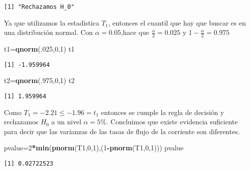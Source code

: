 \documentclass[
  a4paper,
  oneside,
  openany]{book}
\newenvironment{Shaded}{\begin{snugshade}}{\end{snugshade}}
\newcommand{\DecValTok}[1]{\textcolor[rgb]{0.00,0.00,0.81}{#1}}
\newcommand{\KeywordTok}[1]{\textcolor[rgb]{0.13,0.29,0.53}{\textbf{#1}}}
\newcommand{\NormalTok}[1]{#1}
\newcommand{\OperatorTok}[1]{\textcolor[rgb]{0.81,0.36,0.00}{\textbf{#1}}}
\begin{document}
\begin{verbatim}
[1] "Rechazamos H_0"
\end{verbatim}

Ya que utilizamos la estadística \(T_1\), entonces el cuantil que hay que buscar es en una distribución normal. Con \(\alpha=0.05\),hace que \(\frac{\alpha}{2}=0.025\) y \(1-\frac{\alpha}{2}=0.975\)

\begin{Shaded}
\begin{Highlighting}[]
\NormalTok{t1=}\KeywordTok{qnorm}\NormalTok{(.}\DecValTok{025}\NormalTok{,}\DecValTok{0}\NormalTok{,}\DecValTok{1}\NormalTok{)}
\NormalTok{t1}
\end{Highlighting}
\end{Shaded}

\begin{verbatim}
[1] -1.959964
\end{verbatim}

\begin{Shaded}
\begin{Highlighting}[]
\NormalTok{t2=}\KeywordTok{qnorm}\NormalTok{(.}\DecValTok{975}\NormalTok{,}\DecValTok{0}\NormalTok{,}\DecValTok{1}\NormalTok{)}
\NormalTok{t2}
\end{Highlighting}
\end{Shaded}

\begin{verbatim}
[1] 1.959964
\end{verbatim}

Como \(T_1=-2.21\leq -1.96 =t_1\) entonces se cumple la regla de decisión y rechazamos \(H_0\) a un nivel \(\alpha=5\%\). Concluimos que existe evidencia suficiente para decir que las varianzas de las tasas de flujo de la corriente son diferentes.

\begin{Shaded}
\begin{Highlighting}[]
\NormalTok{pvalue=}\DecValTok{2}\OperatorTok{*}\KeywordTok{min}\NormalTok{(}\KeywordTok{pnorm}\NormalTok{(T1,}\DecValTok{0}\NormalTok{,}\DecValTok{1}\NormalTok{),(}\DecValTok{1}\OperatorTok{{-}}\KeywordTok{pnorm}\NormalTok{(T1,}\DecValTok{0}\NormalTok{,}\DecValTok{1}\NormalTok{)))}
\NormalTok{pvalue}
\end{Highlighting}
\end{Shaded}

\begin{verbatim}
[1] 0.02722523
\end{verbatim}
\end{document}
